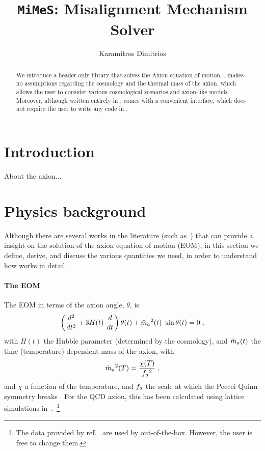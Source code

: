 \documentclass[11pt,a4paper]{article}
\author{Karamitros Dimitrios}
\title{{\tt MiMeS}: Misalignment Mechanism Solver}
\begin{document}
\maketitle

\begin{abstract}
	We introduce a \CPP header-only library that solves the Axion equation of motion, \mimes.  
	\mimes makes no assumptions regarding the cosmology and the thermal mass of the axion, which allows the user 
	to consider various cosmological scenarios and axion-like models.
	Moreover, although written entirely in \CPP, \mimes comes with a convenient \PY interface, which does not require the
	user to write any code in \CPP.
\end{abstract}


\section{Introduction}\label{sec:intro}
\setcounter{equation}{0}

About the axion...

\section{Physics background}\label{sec:abundance}
\setcounter{equation}{0}
%
Although there are several works in the literature (such as~\cite{Chang:1998ys}) that can provide a insight on the solution of the axion equation of motion (EOM), in this section we define, derive, and discuss the various quantities we need, in order to understand how \mimes works in detail.

\paragraph{The EOM} %
%
%
The EOM in terms of the axion angle, $\theta$, is 
%
\begin{equation}
	\lrb{\dfrac{d^2}{d t^2} + 3 H(t) \ \dfrac{d}{d t} } \theta(t) + \maT^2(t) \ \sin \theta(t) = 0 \; ,
	\label{eq:eom}
\end{equation}
%
with $H(t)$ the Hubble parameter (determined by the cosmology), and $\tilde m_{a}{}(t)$  the time (temperature) dependent mass of the axion, with 
\begin{equation}
	\tilde m_{a}{}^2(T) = \dfrac{\chi(T)}{f_{a}{}^2}\;,
	\label{eq:axion_mass_def}
\end{equation} 
%
and $\chi$ a function of the temperature, and $f_{a}{}$ the scale at which the Peccei Quinn symmetry breaks . For the QCD axion, this has been calculated using lattice simulations in~\cite{Borsanyi:2016ksw}.~\footnote{The data provided by ref.~\cite{Borsanyi:2016ksw} are used by  \mimes out-of-the-box. However, the user is free to change them.}
\end{document}

